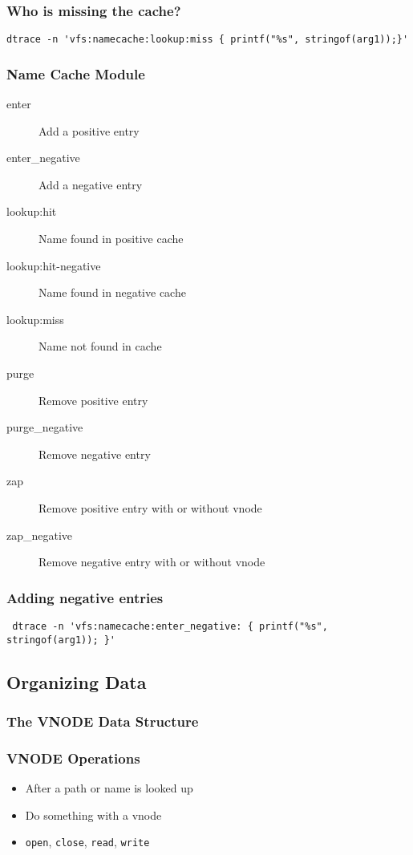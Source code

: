 \documentclass[pdftex]{beamer} %
\begin{document}
\begin{frame}[fragile]
  \frametitle{Who is missing the cache?}
\begin{lstlisting}
dtrace -n 'vfs:namecache:lookup:miss { printf("%s", stringof(arg1));}'
\end{lstlisting}
\end{frame}

\begin{frame}[fragile]
  \frametitle{Name Cache Module}
  \begin{description}
  \item[enter] Add a positive entry
  \item[enter\_negative] Add a negative entry
  \item[lookup:hit] Name found in positive cache
  \item[lookup:hit-negative] Name found in negative cache
  \item[lookup:miss] Name not found in cache
  \item[purge] Remove positive entry
  \item[purge\_negative] Remove negative entry
  \item[zap] Remove positive entry with or without vnode
  \item[zap\_negative] Remove negative entry with or without vnode
  \end{description}
\end{frame}

\begin{frame}[fragile]
  \frametitle{Adding negative entries}
\begin{lstlisting}
 dtrace -n 'vfs:namecache:enter_negative: { printf("%s", stringof(arg1)); }'
\end{lstlisting}
\end{frame}


\subsection{Organizing Data}
\label{sec:organization}

\begin{frame}
  \frametitle{The VNODE Data Structure}
  
\end{frame}

\begin{frame}[fragile]
  \frametitle{VNODE Operations}
  \begin{itemize}
  \item After a path or name is looked up
  \item Do something with a vnode
  \item \verb|open|, \verb|close|, \verb|read|, \verb|write|
  \end{itemize}
\end{frame}
\end{document}
